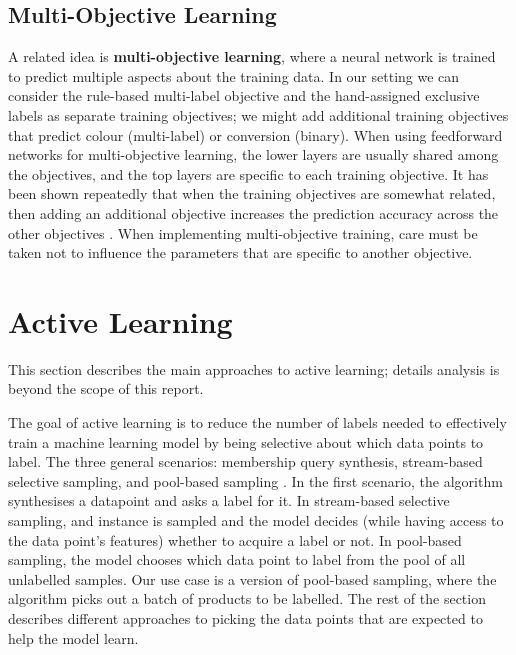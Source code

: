 \subsection{Multi-Objective Learning}
A related idea is \textbf{multi-objective learning}, where a neural network is trained to predict multiple aspects about the training data.
In our setting we can consider the rule-based multi-label objective and the hand-assigned exclusive labels as separate training objectives; we might add additional training objectives that predict colour (multi-label) or conversion (binary).
When using feedforward networks for multi-objective learning, the lower layers are usually shared among the objectives, and the top layers are specific to each training objective.
It has been shown repeatedly that when the training objectives are somewhat related, then adding an additional objective increases the prediction accuracy across the other objectives \cite{}.
When implementing multi-objective training, care must be taken not to influence the parameters that are specific to another objective.



\section{Active Learning}
\label{bg_al}

This section describes the main approaches to active learning;  details analysis is beyond the scope of this report.


The goal of active learning is to reduce the number of labels needed  to effectively train a machine learning model by  being selective about which data points to label.
The three general scenarios: membership query synthesis, stream-based selective sampling, and pool-based sampling \cite{al_survey}.
In the first scenario, the algorithm synthesises a datapoint and asks a label for it.
In stream-based selective sampling, and instance is sampled and  the model decides (while having access to the data point's features) whether to acquire a label or not.
In pool-based sampling, the model chooses which data point to label from the pool of all unlabelled samples.
Our use case is a version of pool-based sampling, where the algorithm picks out a batch of products to be labelled.
The rest of the section describes different approaches to picking the data points that are expected to help the model learn.

